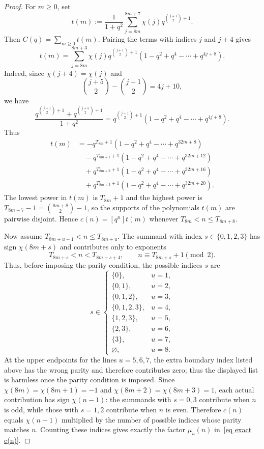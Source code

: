 \documentclass[reqno]{amsart}
\theoremstyle{definition}
\theoremstyle{plain}
\theoremstyle{remark}
\numberwithin{equation}{section}
\begin{document}
\begin{proof}
For $m\ge 0$, set
\[
t(m):=\frac{1}{1+q^2}\sum_{j=8m}^{8m+7}\chi(j)q^{\binom{j+1}{2}+1}.
\]
Then $C(q)=\sum_{m\ge 0} t(m)$.  Pairing the terms with indices $j$ and $j+4$ gives
\begin{equation}\label{id lem main-2}
t(m)=\sum_{j=8m}^{8m+3}\chi(j)q^{\binom{j+1}{2}+1}(1-q^2+q^4-\cdots+q^{4j+8}).
\end{equation}
Indeed, since $\chi(j+4)=\chi(j)$ and
\[
\binom{j+5}{2}-\binom{j+1}{2}=4j+10,
\]
we have
\[
\frac{q^{\binom{j+1}{2}+1}+q^{\binom{j+5}{2}+1}}{1+q^2}
=q^{\binom{j+1}{2}+1}(1-q^2+q^4-\cdots+q^{4j+8}).
\]
Thus
\begin{align*}
t(m)
&= -q^{T_{8m}+1}(1-q^2+q^4-\cdots + q^{32m+8}) \\
&\quad -q^{T_{8m+1}+1}(1-q^2+q^4-\cdots + q^{32m+12}) \\
&\quad +q^{T_{8m+2}+1}(1-q^2+q^4-\cdots + q^{32m+16}) \\
&\quad +q^{T_{8m+3}+1}(1-q^2+q^4-\cdots + q^{32m+20}).
\end{align*}
The lowest power in $t(m)$ is $T_{8m}+1$ and the highest power is $T_{8m+7}-1=\binom{8m+8}{2}-1$, so the supports of the polynomials $t(m)$ are pairwise disjoint. Hence $c(n)=[q^n]t(m)$ whenever $T_{8m}<n\le T_{8m+8}$.

Now assume $T_{8m+u-1}<n\le T_{8m+u}$.  The summand with index $s\in\{0,1,2,3\}$ has sign $\chi(8m+s)$ and contributes only to exponents
\[
T_{8m+s}<n<T_{8m+s+4},\qquad
n\equiv T_{8m+s}+1\pmod 2.
\]
Thus, before imposing the parity condition, the possible indices $s$ are
\[
s\in
\begin{cases}
\{0\}, & u=1,\\
\{0,1\}, & u=2,\\
\{0,1,2\}, & u=3,\\
\{0,1,2,3\}, & u=4,\\
\{1,2,3\}, & u=5,\\
\{2,3\}, & u=6,\\
\{3\}, & u=7,\\
\varnothing, & u=8.
\end{cases}
\]
At the upper endpoints for the lines $u=5,6,7$, the extra boundary index listed above has the wrong parity and therefore contributes zero; thus the displayed list is harmless once the parity condition is imposed. Since $\chi(8m)=\chi(8m+1)=-1$ and $\chi(8m+2)=\chi(8m+3)=1$, each actual contribution has sign $\chi(n-1)$: the summands with $s=0,3$ contribute when $n$ is odd, while those with $s=1,2$ contribute when $n$ is even. Therefore $c(n)$ equals $\chi(n-1)$ multiplied by the number of possible indices whose parity matches $n$. Counting these indices gives exactly the factor $\mu_u(n)$ in~\eqref{eq exact c(n)}.
\end{proof}
\end{document}
